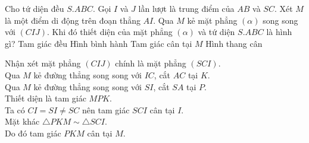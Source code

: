 \begin{ex}%
Cho tứ diện đều $ S.ABC $. Gọi $ I $ và $ J $ lần lượt là trung điểm của $ AB $ và $ SC $. Xét $ M $ là một điểm di động trên đoạn thẳng $ AI $. Qua $ M $ kẻ mặt phẳng $ \left(\alpha\right) $ song song với $ \left(CIJ\right) $. Khi đó thiết diện của mặt phẳng $ \left(\alpha\right) $ và tứ diện $ S.ABC $ là hình gì?
\choice
{ Tam giác đều}
{ Hình bình hành}
{\True Tam giác cân tại $ M $}
{ Hình thang cân}
\loigiai
{\immini
{
Nhận xét mặt phẳng $ (CIJ) $ chính là mặt phẳng $ (SCI) $.\\
Qua $M$ kẻ đường thẳng song song với $IC$, cắt $AC$ tại $K$.\\
Qua $M$ kẻ đường thẳng song song với $SI$, cắt $SA$ tại $P$.\\
Thiết diện là tam giác $ MPK $.\\
Ta  có $ CI = SI \neq SC $ nên tam giác $ SCI  $ cân tại $ I $.\\
Mặt khác $\triangle PKM \sim \triangle SCI $.\\
Do đó tam giác $ PKM $ cân tại $M$.
}
{
}
}
\end{ex}

